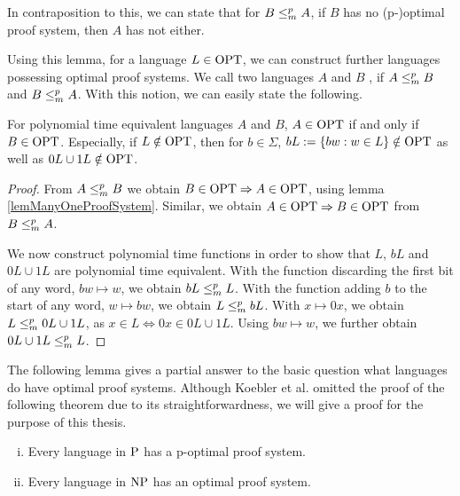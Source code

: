   In contraposition to this, we can state that for \(B \redmany A\), if \(B\) has no (p-)optimal proof system, then \(A\) has not either.
  
  Using this lemma, for a language \(L \in \OPT\), we can construct further languages possessing optimal proof systems. We call two languages \(A\) and \(B\) , if \(A \redmany B\) and \(B \redmany A\). With this notion, we can easily state the following.
  
  \begin{corollary} \label{corFurtherOPT}
    For polynomial time equivalent languages \(A\) and \(B\), \(A \in \OPT\) if and only if \(B \in \OPT\). Especially, if \(L \notin \OPT\), then for \(b \in \Sigma\), \(bL := \{ bw : w \in L \} \notin \OPT\) as well as \(0L \cup 1L \notin \OPT\).
  \end{corollary}
  
  \begin{proof}
    From \(A \redmany B\) we obtain \(B \in \OPT \Rightarrow A \in \OPT\), using lemma \ref{lemManyOneProofSystem}. Similar, we obtain \(A \in \OPT \Rightarrow B \in \OPT\) from \(B \redmany A\).
    
    We now construct polynomial time functions in order to show that \(L\), \(bL\) and \(0L \cup 1L\) are polynomial time equivalent. With the function discarding the first bit of any word, \(bw \mapsto w\), we obtain \(bL \redmany L\). With the function adding \(b\) to the start of any word, \(w \mapsto bw\), we obtain \(L \redmany bL\). With \(x \mapsto 0x\), we obtain \(L \redmany 0L \cup 1L\), as \(x \in L \Leftrightarrow 0x \in 0L \cup 1L\). Using \(bw \mapsto w\), we further obtain \(0L \cup 1L \redmany L\).
  \end{proof}

  The following lemma gives a partial answer to the basic question what languages do have optimal proof systems. Although Koebler et al. omitted the proof of the following theorem due to its straightforwardness, we will give a proof for the purpose of this thesis.

  \begin{lemma} \label{lemPHasOptimalProofSystem}
   \begin{enumerate}[(i)]
    \item Every language in \(\P\) has a p-optimal proof system.
    \item Every language in \(\NP\) has an optimal proof system.
   \end{enumerate}
  \end{lemma}

